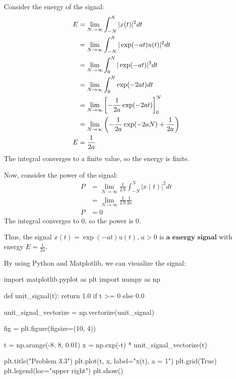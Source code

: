 \documentclass[a4paper, 10pt]{article}
\begin{document}
\begin{solution}
Consider the energy of the signal:
\begin{align*}
    E &= \lim_{N \to \infty} \int_{-N}^{N} |x(t)|^2 dt \\
    &= \lim_{N \to \infty} \int_{-N}^{N} |\exp(-at)u(t)|^2 dt \\
    &= \lim_{N \to \infty} \int_{0}^{N} |\exp(-at)|^2 dt \\
    &= \lim_{N \to \infty} \int_{0}^{N} \exp(-2at) dt \\
    &= \lim_{N \to \infty} \left[ -\frac{1}{2a} \exp(-2at) \right]_{0}^{N} \\
    &= \lim_{N \to \infty} \left( -\frac{1}{2a} \exp(-2aN) + \frac{1}{2a} \right) \\
    E &= \frac{1}{2a}
\end{align*}
The integral converges to a finite value, so the energy is finite.

\vspace{5mm}

Now, consider the power of the signal:
\begin{align*}
    P &= \lim_{N \to \infty} \frac{1}{2N} \int_{-N}^{N} |x(t)|^2 dt \\
    &= \lim_{N \to \infty} \frac{1}{2N} \frac{1}{2a} \\
    P &= 0
\end{align*}
The integral converges to 0, so the power is 0.

\vspace{2mm}

Thus, the signal \( x(t) = \exp(-at)u(t), \,  a > 0 \) is \( \boxed{\textbf{a energy signal}} \) with energy \( \boxed{E = \frac{1}{2a}} \).

\vspace{2mm}

By using Python and Matplotlib, we can visualize the signal:
\begin{codingbox}
import matplotlib.pyplot as plt
import numpy as np

def unit_signal(t):
    return 1.0 if t >= 0 else 0.0

unit_signal_vectorize = np.vectorize(unit_signal)

fig = plt.figure(figsize=(10, 4))

t = np.arange(-8, 8, 0.01)
x = np.exp(-t) * unit_signal_vectorize(t)

plt.title("Problem 3.3")
plt.plot(t, x, label="x(t), a = 1")
plt.grid(True)
plt.legend(loc="upper right")
plt.show()
\end{codingbox}


\end{solution}
\end{document}
